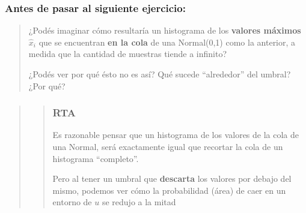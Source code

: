 \documentclass[
]{article}
\begin{document}
\hypertarget{antes-de-pasar-al-siguiente-ejercicio}{%
\subsubsection{Antes de pasar al siguiente
ejercicio:}\label{antes-de-pasar-al-siguiente-ejercicio}}

\begin{quote}
¿Podés imaginar cómo resultaría un histograma de los \textbf{valores
máximos} \(\hat x_i\) que se encuentran \textbf{en la cola} de una
Normal(0,1) como la anterior, a medida que la cantidad de muestras
tiende a infinito?

¿Podés ver por qué ésto no es así? Qué sucede ``alrededor'' del umbral?
¿Por qué?
\end{quote}

\begin{quote}
\begin{quote}
\hypertarget{rta}{%
\subsubsection{RTA}\label{rta}}

Es razonable pensar que un histograma de los valores de la cola de una
Normal, será exactamente igual que recortar la cola de un histograma
``completo''.

Pero al tener un umbral que \textbf{descarta} los valores por debajo del
mismo, podemos ver cómo la probabilidad (área) de caer en un entorno de
\(u\) se redujo a la mitad


\end{quote}
\end{quote}
\end{document}
